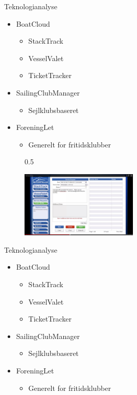 \begin{frame}{Teknologianalyse}
  \begin{itemize}
    \item BoatCloud
    \begin{itemize}
      \item StackTrack
      \item VesselValet
      \item TicketTracker
    \end{itemize}
    \item SailingClubManager
    \begin{itemize}
      \item Sejlklubsbaseret
    \end{itemize}
    \item ForeningLet
    \begin{itemize}
      \item Generelt for fritidsklubber
    \end{itemize}
  \end{itemize}
  \begin{figure}{0.5\textwidth}
    
    \vspace{-30pt}
    \begin{center}
        \includegraphics[width=0.5\textwidth]{images/TicketTracker.jpg}
    \end{center}
    \vspace{-15pt}
    \vspace{-15pt}
    \end{figure}
  
\end{frame}

\begin{frame}{Teknologianalyse}
  \begin{itemize}
    \item BoatCloud
    \begin{itemize}
      \item StackTrack
      \item VesselValet
      \item TicketTracker
    \end{itemize}
    \item SailingClubManager
    \begin{itemize}
      \item Sejlklubsbaseret
    \end{itemize}
    \item ForeningLet
    \begin{itemize}
      \item Generelt for fritidsklubber
    \end{itemize}
  \end{itemize}

\end{frame}

